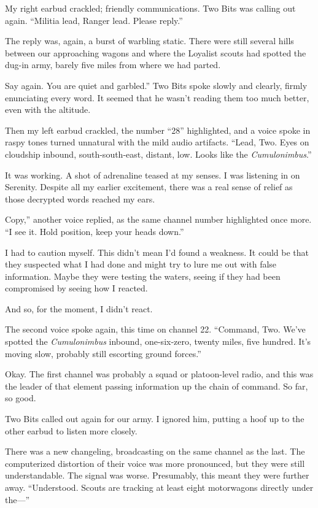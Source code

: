My right earbud crackled; friendly communications. Two Bits was calling out again. “Militia lead, Ranger lead. Please reply.”

The reply was, again, a burst of warbling static. There were still several hills between our approaching wagons and where the Loyalist scouts had spotted the dug-in army, barely five miles from where we had parted.

\leavevmode{}Say again. You are quiet and garbled.” Two Bits spoke slowly and clearly, firmly enunciating every word. It seemed that he wasn’t reading them too much better, even with the altitude.

Then my left earbud crackled, the number “28” highlighted, and a voice spoke in raspy tones turned unnatural with the mild audio artifacts. “Lead, Two. Eyes on cloudship inbound, south-south-east, distant, low. Looks like the \textit{Cumulonimbus}.”

It was working. A shot of adrenaline teased at my senses. I was listening in on Serenity. Despite all my earlier excitement, there was a real sense of relief as those decrypted words reached my ears.

\leavevmode{}Copy,” another voice replied, as the same channel number highlighted once more. “I see it. Hold position, keep your heads down.”

I had to caution myself. This didn’t mean I’d found a weakness. It could be that they suspected what I had done and might try to lure me out with false information. Maybe they were testing the waters, seeing if they had been compromised by seeing how I reacted.

And so, for the moment, I didn’t react.

The second voice spoke again, this time on channel 22. “Command, Two. We’ve spotted the \textit{Cumulonimbus} inbound, one-six-zero, twenty miles, five hundred. It’s moving slow, probably still escorting ground forces.”

Okay. The first channel was probably a squad or platoon-level radio, and this was the leader of that element passing information up the chain of command. So far, so good.

Two Bits called out again for our army. I ignored him, putting a hoof up to the other earbud to listen more closely.

There was a new changeling, broadcasting on the same channel as the last. The computerized distortion of their voice was more pronounced, but they were still understandable. The signal was worse. Presumably, this meant they were further away. “Understood. Scouts are tracking at least eight motorwagons directly under the—”

